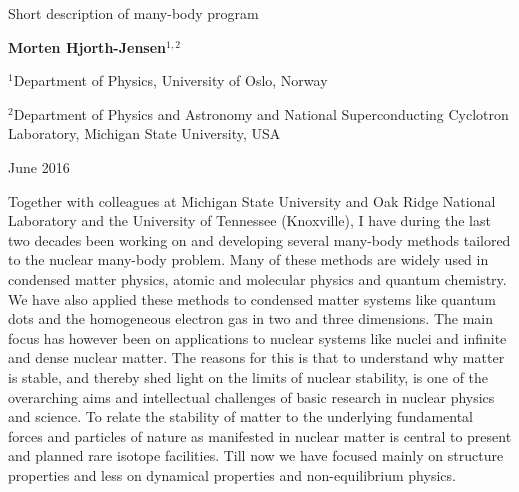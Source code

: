 \documentclass[a4wide,10pt]{article}
\begin{document}

\newcommand{\exercisesection}[1]{\subsection*{#1}}






\thispagestyle{empty}

\begin{center}
{\LARGE\bf
\begin{spacing}{1.25}
Short description of many-body program
\end{spacing}
}
\end{center}


\begin{center}
{\bf Morten Hjorth-Jensen${}^{1, 2}$} \\ [0mm]
\end{center}

\begin{center}
\centerline{{\small ${}^1$Department of Physics, University of Oslo, Norway}}
\centerline{{\small ${}^2$Department of Physics and Astronomy and National Superconducting Cyclotron Laboratory, Michigan State University, USA}}
\end{center}
    

\begin{center}
June 2016
\end{center}

\vspace{1cm}


Together with colleagues at Michigan State University and Oak Ridge National Laboratory and the University of Tennessee (Knoxville), I have during the last two decades been working on and developing several many-body methods tailored to the nuclear many-body problem. Many of these methods are widely used in 
condensed matter physics, atomic and molecular physics and quantum chemistry. We have also applied these methods to condensed matter systems like quantum dots
and the homogeneous electron gas in two and three dimensions. 
The main focus has however been on applications to nuclear systems like nuclei and infinite and dense nuclear matter. The reasons for this is that 
to understand why matter is stable, and thereby shed light on the limits of nuclear stability, is one of the overarching aims and intellectual challenges of basic research in nuclear physics and science. To relate the stability of matter to the underlying fundamental forces and particles of nature as manifested in nuclear matter is central to present and planned rare isotope facilities.
Till now we have focused mainly on structure properties and less on dynamical properties and non-equilibrium physics.
\end{document}
